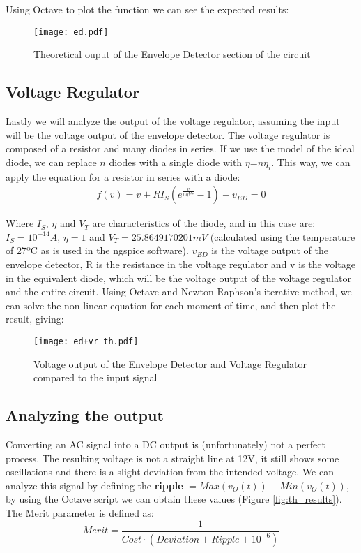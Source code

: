 Using Octave to plot the function we can see the expected results:

\begin{figure}[h]
	\centering
	\texttt{[image: ed.pdf]}
	\caption{Theoretical ouput of the Envelope Detector section of the circuit}
	\label{fig:envelope}
\end{figure}

\newpage

\subsection{Voltage Regulator}
\hspace{12pt} Lastly we will analyze the output of the voltage regulator, assuming the input will be the voltage output of the envelope detector. The voltage regulator is composed of a resistor and many diodes in series. If we use the model of the ideal diode, we can replace $n$ diodes with a single diode with $\eta$=$n\eta _i$. This way, we can apply the equation for a resistor in series with a diode:
\vspace{-8pt}
\begin{gather}
    f(v)=v+RI_S(e^{\frac{v}{n \eta V_T}}-1)-v_{ED}=0 \nonumber
\end{gather}

Where $I_S$, $\eta$ and $V_T$ are characteristics of the diode, and in this case are: $I_S = 10^{-14}A$, $\eta = 1$ and $V_T = 25.8649170201mV$ (calculated using the temperature of 27ºC as is used in the ngspice software). $v_{ED}$ is the voltage output of the envelope detector, R is the resistance in the voltage regulator and v is the voltage in the equivalent diode, which will be the voltage output of the voltage regulator and the entire circuit.
Using Octave and Newton Raphson's iterative method, we can solve the non-linear equation for each moment of time, and then plot the result, giving:

\begin{figure}[h]
	\centering
	\texttt{[image: ed+vr\_th.pdf]}
	\caption{Voltage output of the Envelope Detector and Voltage Regulator compared to the input signal}
	\label{fig:regulator}
\end{figure}

\subsection{Analyzing the output}
\hspace{12pt} Converting an AC signal into a DC output is (unfortunately) not a perfect process. The resulting voltage is not a straight line at 12V, it still shows some oscillations and there is a slight deviation from the intended voltage. We can analyze this signal by defining the \textbf{ripple} $= Max(v_O(t)) - Min(v_O(t))$, by using the Octave script we can obtain these values (Figure \ref{fig:th_results}). The Merit parameter is defined as:
\begin{equation}
	Merit = \frac{1}{Cost \cdot(Deviation + Ripple + 10^{-6})}
\end{equation}

